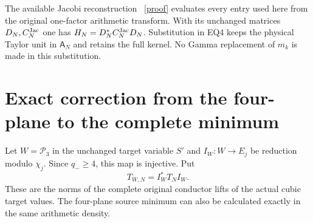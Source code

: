 \documentclass[11pt]{article}
\newcommand{\Pp}{\mathcal P}
\begin{document}
The available Jacobi reconstruction \cite{JC}%
~\href{https://github.com/KokunoYumeto/zeta-function-research-reader/blob/5992ad50c0f2a06921f1fcaded7b4e38097c0739/workbenches/splitzero-tandem/continuations/20260920-original-kernel-mixed-determinants/providers/NATIVE_JACOBI_COMMUTANT.tex\#L1}{[proof]}%
{} evaluates every entry
used here from the original one-factor arithmetic transform. With its
unchanged matrices $D_N,C_N^{\rm Jac}$ one has
$H_N=D_N^*C_N^{\rm Jac}D_N$. Substitution in EQ4 keeps the physical
Taylor unit in $\mathsf A_N$ and retains the full kernel. No Gamma
replacement of $m_k$ is made in this substitution.

\section{Exact correction from the four-plane to the complete minimum}
Let $W=\Pp_3$ in the unchanged target variable $S'$ and
$I_W:W\to E_j$ be reduction modulo $\chi_j$. Since $q_-\ge4$,
this map is injective. Put
\[
 T_{W,N}=I_W^*T_NI_W.                                               \tag{EQ6}
\]
These are the norms of the complete original conductor lifts of
the actual cubic target values. The four-plane source minimum can
also be calculated exactly in the same arithmetic density.
\end{document}
